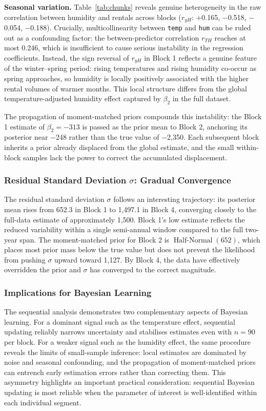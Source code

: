 \textbf{Seasonal variation.} Table~\ref{tab:chunks} reveals genuine heterogeneity
in the raw correlation between humidity and rentals across blocks
($r_{yH}$: $+$0.165, $-$0.518, $-$0.054, $-$0.188). Crucially, multicollinearity
between \texttt{temp} and \texttt{hum} can be ruled out as a confounding factor:
the between-predictor correlation $r_{TH}$ reaches at most 0.246, which is
insufficient to cause serious instability in the regression coefficients. Instead,
the sign reversal of $r_{yH}$ in Block 1 reflects a genuine feature of the
winter--spring period: rising temperatures and rising humidity co-occur as spring
approaches, so humidity is locally positively associated with the higher rental
volumes of warmer months. This local structure differs from the global
temperature-adjusted humidity effect captured by $\beta_2$ in the full dataset.

The propagation of moment-matched priors compounds this instability: the Block 1
estimate of $\beta_2 = -313$ is passed as the prior mean to Block 2,
anchoring its posterior near $-$248 rather than the true value of $-$2{,}350.
Each subsequent block inherits a prior already displaced from the global estimate,
and the small within-block samples lack the power to correct the accumulated
displacement.

\subsubsection{Residual Standard Deviation $\sigma$: Gradual Convergence}

The residual standard deviation $\sigma$ follows an interesting trajectory: its
posterior mean rises from 652.3 in Block 1 to 1{,}497.1 in Block 4, converging
closely to the full-data estimate of approximately 1{,}500. Block 1's low estimate
reflects the reduced variability within a single semi-annual window compared to
the full two-year span. The moment-matched prior for Block 2 is
$\operatorname{Half-Normal}(652)$, which places most prior mass below the true
value but does not prevent the likelihood from pushing $\sigma$ upward toward
1{,}127. By Block 4, the data have effectively overridden the prior and
$\sigma$ has converged to the correct magnitude.

\subsubsection{Implications for Bayesian Learning}

The sequential analysis demonstrates two complementary aspects of Bayesian
learning. For a dominant signal such as the temperature effect, sequential
updating reliably narrows uncertainty and stabilises estimates even with
$n = 90$ per block. For a weaker signal such as the humidity effect, the same
procedure reveals the limits of small-sample inference: local estimates are
dominated by noise and seasonal confounding, and the propagation of moment-matched
priors can entrench early estimation errors rather than correcting them. This
asymmetry highlights an important practical consideration: sequential Bayesian
updating is most reliable when the parameter of interest is well-identified
within each individual segment.
